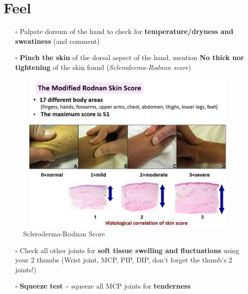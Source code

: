 \documentclass[
  13.5pt,
  a4paper,
  DIV=11,
  numbers=noendperiod]{scrreprt}
\providecommand{\tightlist}{%
  \setlength{\itemsep}{0pt}\setlength{\parskip}{0pt}}
\begin{document}

\chapter{Feel}\label{feel}

\begin{itemize}
\tightlist
\item[$\square$]
  Palpate dorsum of the hand to check for \textbf{temperature/dryness
  and sweatiness} (and comment)
\item[$\square$]
  \textbf{Pinch the skin} of the dorsal aspect of the hand, mention
  \textbf{No thick nor tightening} of the skin found
  (\emph{Scleroderma-Rodnan score})
\end{itemize}

\begin{figure}[H]

{\centering \includegraphics[width=5.20833in,height=3.125in]{mss10.png}

}

\caption{Scleroderma-Rodnan Score}

\end{figure}%

\begin{itemize}
\tightlist
\item[$\square$]
  Check all other joints for \textbf{soft tissue swelling and
  fluctuations} using your 2 thumbs (Wrist joint, MCP, PIP, DIP, don't
  forget the thumb's 2 joints!)
\item[$\square$]
  \textbf{Squeeze test} \textasciitilde{} squeeze all MCP joints for
  \textbf{tenderness}
\end{itemize}

\end{document}
